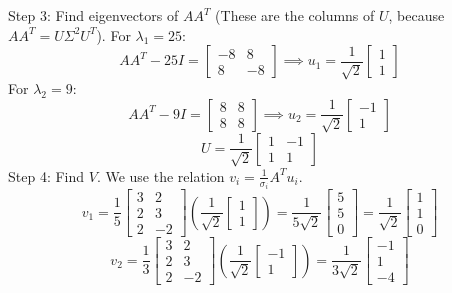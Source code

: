 \documentclass[11pt, letterpaper]{article}
\theoremstyle{definition}
\theoremstyle{remark}
\begin{document}
Step 3: Find eigenvectors of $AA^T$ (These are the columns of $U$, because $AA^T = U \Sigma^2 U^T$).
For $\lambda_1 = 25$:
\[
AA^T - 25I = \begin{bmatrix} -8 & 8 \\ 8 & -8 \end{bmatrix} \implies u_1 = \frac{1}{\sqrt{2}}\begin{bmatrix} 1 \\ 1 \end{bmatrix}
\]
For $\lambda_2 = 9$:
\[
AA^T - 9I = \begin{bmatrix} 8 & 8 \\ 8 & 8 \end{bmatrix} \implies u_2 = \frac{1}{\sqrt{2}}\begin{bmatrix} -1 \\ 1 \end{bmatrix}
\]
\[
U = \frac{1}{\sqrt{2}} \begin{bmatrix} 1 & -1 \\ 1 & 1 \end{bmatrix}
\]
Step 4: Find $V$. We use the relation $v_i = \frac{1}{\sigma_i} A^T u_i$.
\[
v_1 = \frac{1}{5} \begin{bmatrix} 3 & 2 \\ 2 & 3 \\ 2 & -2 \end{bmatrix} \left( \frac{1}{\sqrt{2}} \begin{bmatrix} 1 \\ 1 \end{bmatrix} \right) = \frac{1}{5\sqrt{2}} \begin{bmatrix} 5 \\ 5 \\ 0 \end{bmatrix} = \frac{1}{\sqrt{2}} \begin{bmatrix} 1 \\ 1 \\ 0 \end{bmatrix}
\]
\[
v_2 = \frac{1}{3} \begin{bmatrix} 3 & 2 \\ 2 & 3 \\ 2 & -2 \end{bmatrix} \left( \frac{1}{\sqrt{2}} \begin{bmatrix} -1 \\ 1 \end{bmatrix} \right) = \frac{1}{3\sqrt{2}} \begin{bmatrix} -1 \\ 1 \\ -4 \end{bmatrix}
\]
\end{document}
